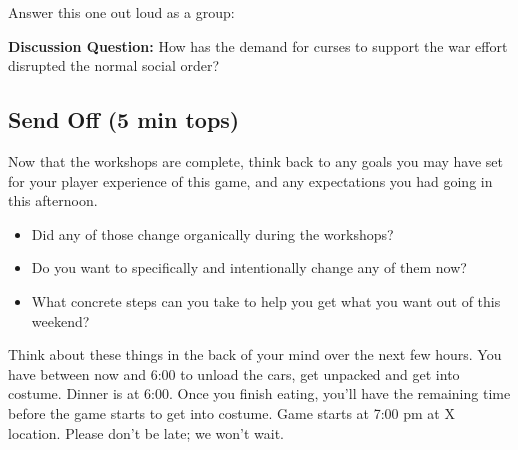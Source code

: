 \documentclass[green]{GL2020}
\begin{document}
Answer this one out loud as a group:

\textbf{Discussion Question:} How has the demand for curses to support the war effort disrupted the normal social order?

\subsection*{Send Off (5 min tops)}
Now that the workshops are complete, think back to any goals you may have set for your player experience of this game, and any expectations you had going in this afternoon. 
\begin{itemize}
	\item Did any of those change organically during the workshops? 
	\item Do you want to specifically and intentionally change any of them now? 
	\item What concrete steps can you take to help you get what you want out of this weekend?
\end{itemize}

Think about these things in the back of your mind over the next few hours. You have between now and 6:00 to unload the cars, get unpacked and get into costume. Dinner is at 6:00. Once you finish eating, you’ll have the remaining time before the game starts to get into costume. Game starts at 7:00 pm at X location. Please don’t be late; we won’t wait.
\end{document}
